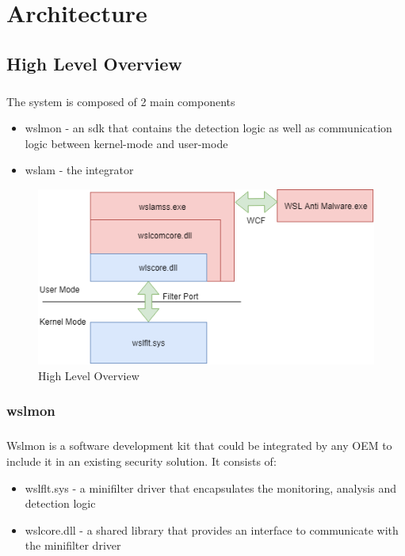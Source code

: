 \chapter{Architecture}
    \section{High Level Overview}
        \paragraph{}
        The system is composed of 2 main components
        \begin{itemize}
            \item wslmon - an sdk that contains the detection logic as well as communication logic between kernel-mode and user-mode
            \item wslam - the integrator
        \end{itemize}

        \begin{figure}[H]
            \includegraphics[width=\linewidth]{img/high_level_overview_diagram.png}
            \caption{High Level Overview}
            \label{fig:high_level_overview_diagram}
        \end{figure}

    \subsection{wslmon}
        \paragraph{}
        Wslmon is a software development kit that could be integrated by any OEM to include it in an existing security solution. It consists of:
        \begin{itemize}
            \item wslflt.sys - a minifilter driver that encapsulates the monitoring, analysis and detection logic
            \item wslcore.dll - a shared library that provides an interface to communicate with the minifilter driver
        \end{itemize}
